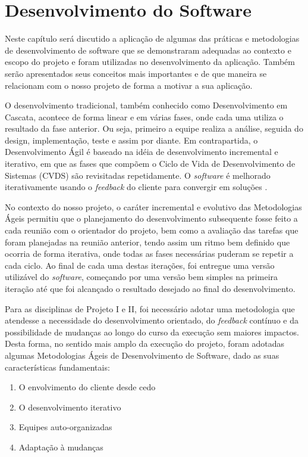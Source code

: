 \chapter{Desenvolvimento do Software}
\thispagestyle{empty} %


Neste capítulo será discutido a aplicação de algumas das práticas e metodologias de desenvolvimento de software que se demonstraram adequadas ao contexto e escopo do projeto e foram utilizadas no desenvolvimento da aplicação. Também serão apresentados seus conceitos mais importantes e de que maneira se relacionam com o nosso projeto de forma a motivar a sua aplicação.

O desenvolvimento tradicional, também conhecido como Desenvolvimento em Cascata, acontece de forma linear e em várias fases, onde cada uma utiliza o resultado da fase anterior. Ou seja, primeiro a equipe realiza a análise, seguida do design, implementação, teste e assim por diante. Em contrapartida, o Desenvolvimento Ágil é baseado na idéia de desenvolvimento incremental e iterativo, em que as fases que compõem o Ciclo de Vida de Desenvolvimento de Sistemas (CVDS) são revisitadas repetidamente. O \textit{software} é melhorado iterativamente usando o \textit{feedback} do cliente para convergir em soluções \cite{book:szalvay}. 

No contexto do nosso projeto, o caráter incremental e evolutivo das Metodologias Ágeis permitiu que o planejamento do desenvolvimento subsequente fosse feito a cada reunião com o orientador do projeto, bem como a avaliação das tarefas que foram planejadas na reunião anterior, tendo assim um ritmo bem definido que ocorria de forma iterativa, onde todas as fases necessárias puderam se repetir a cada ciclo. Ao final de cada uma destas iterações, foi entregue uma versão utilizável do \textit{software}, começando por uma versão bem simples na primeira iteração até que foi alcançado o resultado desejado ao final do desenvolvimento.

Para as disciplinas de Projeto I e II, foi necessário adotar uma metodologia que atendesse a necessidade do desenvolvimento orientado, do \textit{feedback} contínuo e da possibilidade de mudanças ao longo do curso da execução sem maiores impactos. Desta forma, no sentido mais amplo da execução do projeto, foram adotadas algumas Metodologias Ágeis de Desenvolvimento de Software, dado as suas características fundamentais:

\begin{enumerate}
    \item O envolvimento do cliente desde cedo
    \item O desenvolvimento iterativo
    \item Equipes auto-organizadas
    \item Adaptação à mudanças
\end{enumerate}

